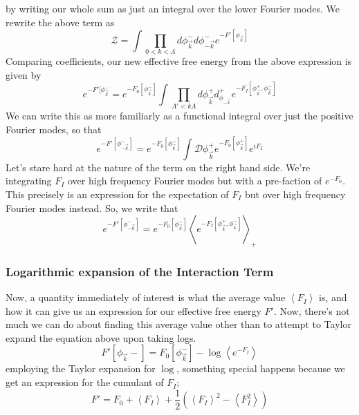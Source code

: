 by writing our whole sum as just an integral 
over the lower Fourier modes. We rewrite the 
above term as 
\[
  \mathcal{ Z } = \int \prod_{ 0 < k < \Lambda } d \phi _{ \vec{k} } ^ -  d \phi _{  - \vec{k} } ^ - 
  e ^{ - F ' [ \phi _{ \vec{k} }  ] }
\] Comparing coefficients, our 
new effective free energy from the above expression is given by 
\[
	e ^{  - F ' [ \phi_{ \vec{k} } ^ -  } = e^{  - F_0 \left[  \phi _{ \vec{k} } ^ -  \right]  }
	\int \prod_{ \Lambda ' < k \Lambda } d \phi _{ \vec{k}  } ^ + d_{ \phi _{ - \vec{k} } } ^ + 
	e ^{  - F_{I } [ \phi_{ \vec{k} } ^ + , \phi _{ \vec{k} } ^ - ] }
\] We can write this 
as more familiarly as a functional integral over 
just the positive Fourier modes, so that 
\[
	e ^{  - F ' [ \phi _{ -\vec{k} } ^ - ] } = 
	e^{  -F_0 [ \phi _{ \vec{k} } ^ - ]  } \int \mathcal{ D } \phi_{ \vec{k} } ^ + 
	e^{  - F_0 [ \phi _{ \vec{k} } ^ + ]} e^{ i F_I }
\] Let's stare hard at the nature of the term on 
the right hand side. We're integrating $ F _ I $ over high frequency 
Fourier modes but with a pre-faction of $ e ^{  - F _0 }$. 
This precisely is an expression for the expectation of 
$ F _ I $ but over high frequency Fourier modes instead. 
So, we write that 
\[
 	e ^{  - F ' [ \phi _{ -\vec{k} } ^ - ] } = 
	e^{  -F_0 [ \phi _{ \vec{k} } ^ - ]  }  \left< e ^{ - F_I [ \phi_{ \vec{k} } ^ + , 
	\phi _{ \vec{k} } ^ - ] } \right>_+ 
\] 
\subsubsection{Logarithmic expansion of the Interaction Term} 
Now, a quantity immediately 
of interest is what the average value $ \left< F _ I  \right> $ is, 
and how it can give us an expression for 
our effective free energy $ F ' $. 
Now, there's not much we can do about finding 
this average value other than to attempt to 
Taylor expand the equation above 
upon taking logs. 
\[
	F ' [ \phi_{ \vec{k} }  - ] = F_0 [ \phi _{ \vec{k} } ^ - ]  - \log \left< e^{  - F_I } \right>
\] employing the Taylor expansion for $ \log$, 
something special happens because we get 
an expression for the cumulant of $ F _ I $; 
 \[
	 F ' = F _ 0 + \left< F _ I  \right> + \frac{1}{2 } \left( \left< F _ I  \right> ^ 2 - 
	 \left< F _ I  ^ 2  \right> \right) 
\]

